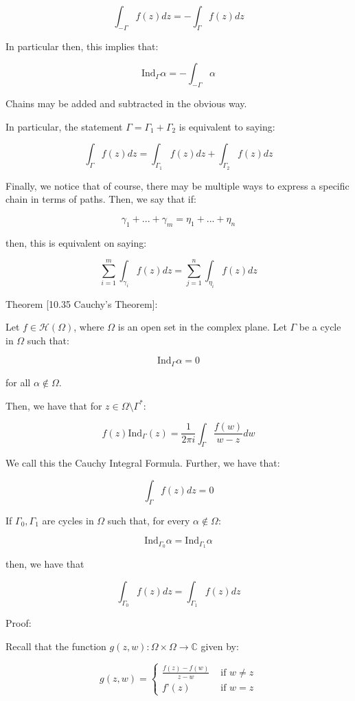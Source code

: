 \documentclass[10pt]{article}
\newcommand{\calH}{\mathcal{H}}
\newcommand{\ind}{\text{Ind}}
\begin{document}
$$ \int_{-\Gamma} f(z) dz = - \int_{\Gamma} f(z) dz $$

In particular then, this implies that:

$$\ind_\Gamma \alpha = - \int_{-\Gamma} \alpha$$

Chains may be added and subtracted in the obvious way.

In particular, the statement $\Gamma = \Gamma_1 + \Gamma_2$ is equivalent to saying:

$$\int_\Gamma f(z) dz = \int_{\Gamma_1} f(z) dz + \int_{\Gamma_2} f(z) dz$$

Finally, we notice that of course, there may be multiple ways to express a specific chain in terms of paths. Then, we say that if:

$$ \gamma_1 + ... + \gamma_m = \eta_1 + ... + \eta_n$$

then, this is equivalent on saying:

$$\sum_{i=1}^m \int_{\gamma_i} f(z) dz = \sum_{j=1}^n \int_{\eta_i} f(z) dz $$

Theorem [10.35 Cauchy’s Theorem]:

Let $f \in \calH(\Omega)$, where $\Omega$ is an open set in the complex plane. Let $\Gamma$ be a cycle in $\Omega$ such that:

$$ \ind_\Gamma \alpha = 0 $$

for all $\alpha \not \in \Omega$.

Then, we have that for $z \in \Omega \setminus \Gamma^*$:

$$ f(z) \ind_\Gamma(z) = \frac{1}{2\pi i} \int_\Gamma \frac{f(w)}{w - z} dw $$

We call this the Cauchy Integral Formula. Further, we have that:

$$\int_\Gamma f(z) dz = 0$$

If $\Gamma_0, \Gamma_1$ are cycles in $\Omega$ such that, for every $\alpha \not \in \Omega$:

$$\ind_{\Gamma_0} \alpha = \ind_{\Gamma_1} \alpha$$

then, we have that

$$\int_{\Gamma_0} f(z)dz = \int_{\Gamma_1} f(z) dz$$

Proof:

Recall that the function $g(z,w): \Omega \times \Omega \to \mathbb{C}$ given by:

$$ g(z,w) = \begin{cases} \frac{f(z) - f(w)}{z  - w} & \text{ if } w \not = z \\ f’(z) & \text{ if } w = z \end{cases} $$
\end{document}
